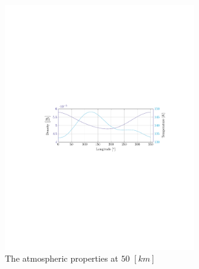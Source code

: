 \begin{figure}[ht!]
	\centering
	\begin{subfigure}{0.9\textwidth}
	\centering
	\includegraphics[trim={4.25cm 11cm 3.2cm 11cm},clip,width=0.9\textwidth]{Figure/atmos_model/lon_50.pdf}
	\caption{The atmospheric properties at $50$ $\left[km\right]$} 
	\label{fig:atmos_lon_50}
	\end{subfigure}
	\begin{subfigure}{0.9\textwidth}
	\centering

\end{subfigure}
\end{figure}
